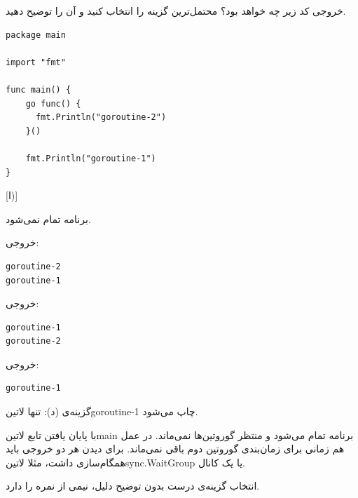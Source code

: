 
خروجی کد زیر چه خواهد بود؟ محتمل‌ترین گزینه را انتخاب کنید و آن را توضیح دهید.

\begin{latin}
\begin{verbatim}
package main

import "fmt"

func main() {
    go func() {
      fmt.Println("goroutine-2")
    }()

    fmt.Println("goroutine-1")
}
\end{verbatim}
\end{latin}

[ا)]

 برنامه تمام نمی‌شود.

 خروجی:

\begin{latin}
\begin{verbatim}
goroutine-2
goroutine-1
\end{verbatim}
\end{latin}

 خروجی:

\begin{latin}
\begin{verbatim}
goroutine-1
goroutine-2
\end{verbatim}
\end{latin}

 خروجی:

\begin{latin}
\begin{verbatim}
goroutine-1
\end{verbatim}
\end{latin}



\begin{پاسخ}

گزینه‌ی (د): تنها ‌لاتین{goroutine-1} چاپ می‌شود.

با پایان یافتن تابع ‌لاتین{main} برنامه تمام می‌شود و منتظر گوروتین‌ها نمی‌ماند.
در عمل هم زمانی برای زمان‌بندی گوروتین دوم باقی نمی‌ماند.
برای دیدن هر دو خروجی باید همگام‌سازی داشت، مثلا ‌لاتین{sync.WaitGroup} یا یک کانال.

انتخاب گزینه‌ی درست بدون توضیح دلیل، نیمی از نمره را دارد.

\end{پاسخ}
